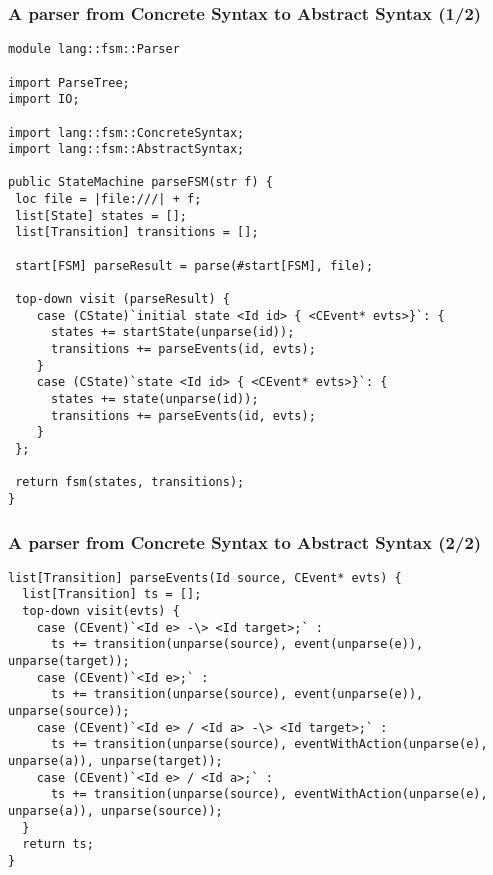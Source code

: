 \documentclass{beamer}
\begin{document}
\begin{frame}[fragile]
\frametitle{A parser from Concrete Syntax to Abstract Syntax (1/2)}

\begin{lstlisting}[language=Rascal]
module lang::fsm::Parser

import ParseTree;
import IO;

import lang::fsm::ConcreteSyntax;
import lang::fsm::AbstractSyntax; 

public StateMachine parseFSM(str f) {
 loc file = |file:///| + f;
 list[State] states = [];
 list[Transition] transitions = [];
 
 start[FSM] parseResult = parse(#start[FSM], file);
 
 top-down visit (parseResult) {
    case (CState)`initial state <Id id> { <CEvent* evts>}`: {
      states += startState(unparse(id));
      transitions += parseEvents(id, evts);
    }
    case (CState)`state <Id id> { <CEvent* evts>}`: {
      states += state(unparse(id));
      transitions += parseEvents(id, evts);
    }
 };
 
 return fsm(states, transitions);
}
\end{lstlisting}

\end{frame}

\begin{frame}[fragile]
\frametitle{A parser from Concrete Syntax to Abstract Syntax (2/2)}

\begin{lstlisting}[language=Rascal]
list[Transition] parseEvents(Id source, CEvent* evts) {
  list[Transition] ts = [];
  top-down visit(evts) {
    case (CEvent)`<Id e> -\> <Id target>;` : 
      ts += transition(unparse(source), event(unparse(e)), unparse(target));
    case (CEvent)`<Id e>;` : 
      ts += transition(unparse(source), event(unparse(e)), unparse(source));
    case (CEvent)`<Id e> / <Id a> -\> <Id target>;` : 
      ts += transition(unparse(source), eventWithAction(unparse(e), unparse(a)), unparse(target));
    case (CEvent)`<Id e> / <Id a>;` : 
      ts += transition(unparse(source), eventWithAction(unparse(e), unparse(a)), unparse(source));
  }
  return ts;
}
\end{lstlisting}

\end{frame}
\end{document}
